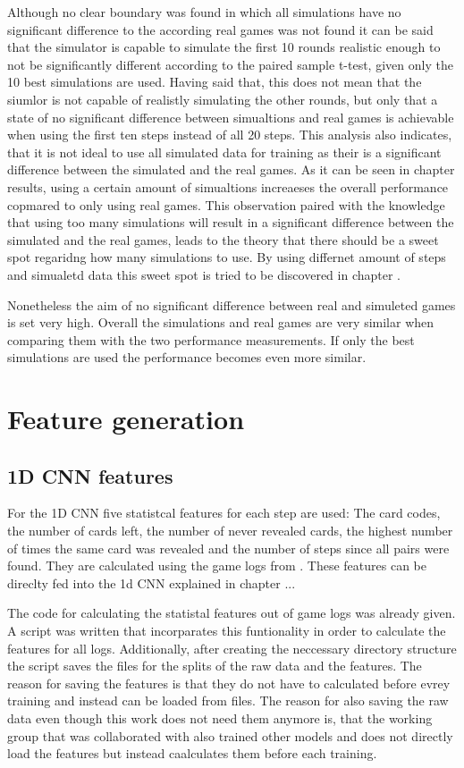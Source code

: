 Although no clear boundary was found in which all simulations have no significant difference to the according real games was not found it can be said that the simulator is capable to simulate the first 10 rounds realistic enough to not be significantly different according to the paired sample t-test, given only the 10 best simulations are used. Having said that, this does not mean that the siumlor is not capable of realistly simulating the other rounds, but only that a state of no significant difference between simualtions and real games is achievable when using the first ten steps instead of all 20 steps. This analysis also indicates, that it is not ideal to use all simulated data for training as their is a significant difference between the simulated and the real games. As it can be seen in chapter results, using a certain amount of simualtions increaeses the overall performance copmared to only using real games. This observation paired with the knowledge that using too many simulations will result in a significant difference between the simulated and the real games, leads to the theory that there should be a sweet spot regaridng how many simulations to use. By using differnet amount of steps and simualetd data this sweet spot is tried to be discovered in chapter .

Nonetheless the aim of no significant difference between real and simuleted games is set very high. Overall the simulations and real games are very similar when comparing them with the two performance measurements. If only the best simulations are used the performance becomes even more similar.   

\section{Feature generation}

\subsection{1D CNN features}
For the 1D CNN five statistcal features for each step are used: The card codes, the number of cards left, the number of never revealed cards,  the highest number of times the same card was revealed and the number of steps  since all pairs were found. They are calculated using the game logs from . 
These features can be direclty fed into the 1d CNN explained in chapter ... 

The code for calculating the statistal features out of game logs was already given. A script was written that incorparates this funtionality in order to calculate the features for all logs. Additionally, after creating the neccessary directory structure the script saves the files for the splits of the raw data and the features. The reason for saving the features is that they do not have to calculated before evrey training and instead can be loaded from files. The reason for also saving the raw data even though this work does not need them anymore is, that the working group that was collaborated with also trained other models and does not directly load the features but instead caalculates them before each training.

